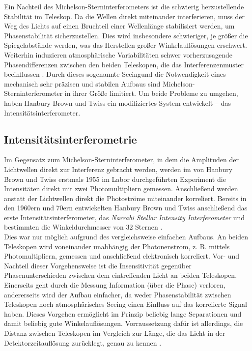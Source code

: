 Ein Nachteil des Michelson-Sterninterferometers ist die schwierig herzustellende Stabilität im Teleskop. 
Da die Wellen direkt miteinander interferieren, muss der Weg des Lichts auf einen Bruchteil einer Wellenlänge stabilisiert werden, um Phasenstabilität sicherzustellen. 
Dies wird insbesondere schwieriger, je größer die Spiegelabstände werden, was das Herstellen großer Winkelauflösungen erschwert. 
Weiterhin induzieren atmosphärische Variabilitäten schwer vorherzusagende Phasendifferenzen zwischen den beiden Teleskopen, die das Interferenzenmuster beeinflussen \cite[Kap. 2]{brownIntensityInterferometerIts1974}. 
Durch dieses sogenannte \glqq Seeing\grqq\;und die Notwendigkeit eines mechanisch sehr präzisen und stabilen Aufbaus sind Michelson-Sterninterferometer in ihrer Größe limitiert. 
Um beide Probleme zu umgehen, haben Hanbury Brown und Twiss ein modifiziertes System entwickelt -- das Intensitätsinterferometer.

\subsection{Intensitätsinterferometrie}
\label{ssec:Intensitätsinterferometrie}
Im Gegensatz zum Michelson-Sterninterferometer, in dem die Amplituden der Lichtwellen direkt zur Interferenz gebracht werden, werden im von Hanbury Brown und Twiss erstmals 1955 im Labor durchgeführten Experiment \cite{brownCorrelationPhotonsTwo1956} die Intensitäten direkt mit zwei Photomultipliern gemessen. 
Anschließend werden anstatt der Lichtwellen direkt die Photoströme miteinander korreliert. 
Bereits in den 1960ern und 70ern entwickelten Hanbury Brown und Twiss anschließend das erste Intensitätsinterferometer, das \emph{Narrabi Stellar Intensity Interferometer} und bestimmten die Winkeldurchmesser von 32 Sternen \cite[Kap. 1]{brownIntensityInterferometerIts1974}. \\
Dies war nur möglich aufgrund des vergleichsweise einfachen Aufbaus. 
An beiden Teleskopen wird voneinander unabhängig der Photonenstrom, z. B. mittels Photomultipliern, gemessen und anschließend elektronisch korreliert. 
Vor- und Nachteil dieser Vorgehensweise ist die Insensitivität gegenüber Phasenunterschieden zwischen dem eintreffenden Licht an beiden Teleskopen. 
Einerseits geht durch die Messung Information (über die Phase) verloren, andererseits wird der Aufbau einfacher, da weder Phasenstabilität zwischen Teleskopen noch atmosphärisches Seeing einen Einfluss auf das korrelierte Signal haben.
Dieses Vorgehen ermöglicht im Prinzip beliebig lange Separationen und damit beliebig gute Winkelauflösungen. 
Vorraussetzung dafür ist allerdings, die Distanz zwischen Teleskopen im Vergleich zur Länge, die das Licht in der Detektorzeitauflösung zurücklegt, genau zu kennen \cite{DemonstrationStellarIntensity}. 
\\

